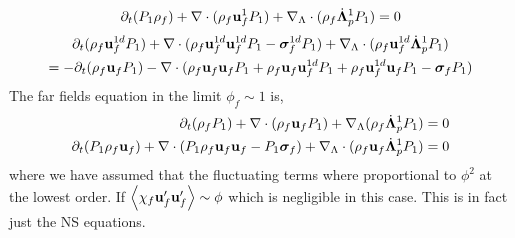 \documentclass[11pt]{My_preprint}
\begin{document}
\begin{equation*}
    \partial_t ( P_1  \rho_f )
    + \mathbf{\nabla}\cdot (
        \rho_f  \textbf{u}_f^1 P_1 
        )
    +  \mathbf{\nabla}_\Lambda \cdot ( \rho_f \dot{\bm\Lambda}_p^1 P_1 )
    = 
    0 
\end{equation*}
\begin{multline}
    \partial_t (\rho_f \textbf{u}_f^{1d}  P_1)
    + \mathbf{\nabla}\cdot (
         \rho_f \textbf{u}_f^{1d} \textbf{u}_f^{1d}  P_1
        - \bm\sigma_f^{1d} P_1
        )
    +  \mathbf{\nabla}_\Lambda \cdot ( \rho_f \textbf{u}_f^{1d} \dot{\bm\Lambda}_p^1  P_1 )\\
    = 
    - \partial_t (\rho_f \textbf{u}_f  P_1)
    - \mathbf{\nabla}\cdot (
        \rho_f \textbf{u}_f \textbf{u}_f  P_1
        + \rho_f \textbf{u}_f \textbf{u}_f^{1d}  P_1
        + \rho_f \textbf{u}_f^{1d} \textbf{u}_f  P_1
        - \bm\sigma_f P_1
        )
\end{multline}
The far fields equation in the limit $\phi_f \sim 1$ is, 
\begin{align*}
    \partial_t (\rho_f P_1 )  
    + \mathbf{\nabla}\cdot (\rho_f\textbf{u}_f P_1)
    + \mathbf{\nabla}_\Lambda (\rho_f\dot{\bm\Lambda}_p^1 P_1)
    = 
    0\\
    \partial_t (P_1 \rho_f\textbf{u}_f)  
    + \mathbf{\nabla}\cdot (
        P_1 \rho_f\textbf{u}_f\textbf{u}_f
        - P_1 \bm\sigma_f
    )
    + \mathbf{\nabla}_\Lambda\cdot(\rho_f \textbf{u}_f \dot{\bm\Lambda}_p^1 P_1)
    = 0
\end{align*}
where we have assumed that the fluctuating terms where proportional to $\phi^2$ at the lowest order. 
If $\left<\chi_f \textbf{u}_f' \textbf{u}_f'\right> \sim \phi $ which is negligible in this case. 
This is in fact just the NS equations. 
\end{document}
